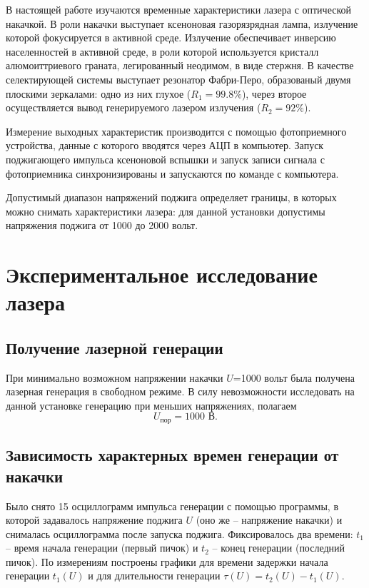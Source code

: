 \documentclass[a4paper,14pt]{extarticle}
\begin{document}
В настоящей работе изучаются временные характеристики лазера с оптической накачкой. В роли накачки выступает ксеноновая газорязрядная лампа, излучение которой фокусируется в активной среде. Излучение обеспечивает инверсию населенностей в активной среде, в роли которой используется кристалл алюмоиттриевого граната, легированный неодимом, в виде стержня. В качестве селектирующей системы выступает резонатор Фабри-Перо, образованый двумя плоскими зеркалами: одно из них глухое ($R_1=99.8\%$), через второе осуществляется вывод генерируемого лазером излучения ($R_2=92\%$).

Измерение выходных характеристик производится с помощью фотоприемного устройства, данные с которого вводятся через АЦП в компьютер. Запуск поджигающего импульса ксеноновой вспышки и запуск записи сигнала с фотоприемника синхронизированы и запускаются по команде с компьютера.

Допустимый диапазон напряжений поджига определяет границы, в которых можно снимать характеристики лазера: для данной установки допустимы напряжения поджига от 1000 до 2000 вольт.


\newpage

\section{Экспериментальное исследование лазера}
\subsection{Получение лазерной генерации}

При минимально возможном напряжении накачки $U$=1000 вольт была получена лазерная генерация в свободном режиме. В силу невозможности исследовать на данной установке генерацию при меньших напряжениях, полагаем
\begin{equation}
  U_\text{пор}=1000\text{ В}.
\end{equation}


\subsection{Зависимость характерных времен генерации от накачки}
Было снято 15 осциллограмм импульса генерации с помощью программы, в которой задавалось напряжение поджига $U$ (оно же -- напряжение накачки) и снималась осциллограмма после запуска поджига. Фиксировалось два времени: $t_1$ -- время начала генерации (первый пичок) и $t_2$ -- конец генерации (последний пичок). По измерениям построены графики для времени задержки начала генерации $t_1(U)$ и для длительности генерации $\tau(U)=t_2(U)-t_1(U)$.
\end{document}
